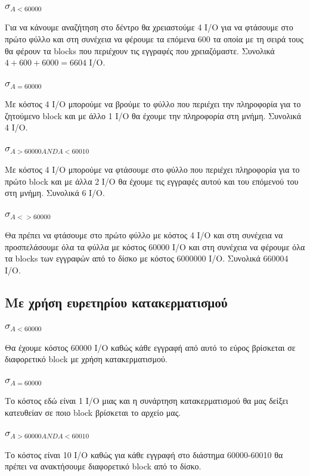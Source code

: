 \documentclass[a4paper,10pt]{article}
\begin{document}
\subsubsection{$\sigma_{A < 60000}$}
Για να κάνουμε αναζήτηση στο δέντρο θα χρειαστούμε 4 I/O για να φτάσουμε στο
πρώτο φύλλο και στη συνέχεια να φέρουμε τα επόμενα 600 τα οποία με τη σειρά
τους θα φέρουν τα blocks που περιέχουν τις εγγραφές που χρειαζόμαστε. Συνολικά
$4+600+6000=6604$ I/O.
\subsubsection{$\sigma_{A = 60000}$}
Με κόστος 4 I/O μπορούμε να βρούμε το φύλλο που περιέχει την πληροφορία για το
ζητούμενο block και με άλλο 1 I/O θα έχουμε την πληροφορία στη μνήμη. Συνολικά
4 I/O.
\subsubsection{$\sigma_{A > 60000 AND A < 60010}$}
Με κόστος 4 I/O μπορούμε να φτάσουμε στο φύλλο που περιέχει πληροφορία για το
πρώτο block και με άλλα 2 I/O θα έχουμε τις εγγραφές αυτού και του επόμενού
του στη μνήμη. Συνολικά 6 I/O.
\subsubsection{$\sigma_{A <> 60000}$}
Θα πρέπει να φτάσουμε στο πρώτο φύλλο με κόστος 4 I/O και στη συνέχεια να
προσπελάσουμε όλα τα φύλλα με κόστος 60000 I/O και στη συνέχεια να φέρουμε
όλα τα blocks των εγγραφών από το δίσκο με κόστος 6000000 I/O. Συνολικά 660004
I/O.
\subsection{Με χρήση ευρετηρίου κατακερματισμού}
\subsubsection{$\sigma_{A < 60000}$}
Θα έχουμε κόστος 60000 I/O καθώς κάθε εγγραφή από αυτό το εύρος βρίσκεται σε
διαφορετικό block με χρήση κατακερματισμού.
\subsubsection{$\sigma_{A = 60000}$}
Το κόστος εδώ είναι 1 I/O μιας και η συνάρτηση κατακερματισμού θα μας δείξει
κατευθείαν σε ποιο block βρίσκεται το αρχείο μας.
\subsubsection{$\sigma_{A > 60000 AND A < 60010}$}
Το κόστος είναι 10 I/O καθώς για κάθε εγγραφή στο διάστημα 60000-60010 θα
πρέπει να ανακτήσουμε διαφορετικό block από το δίσκο.
\end{document}
